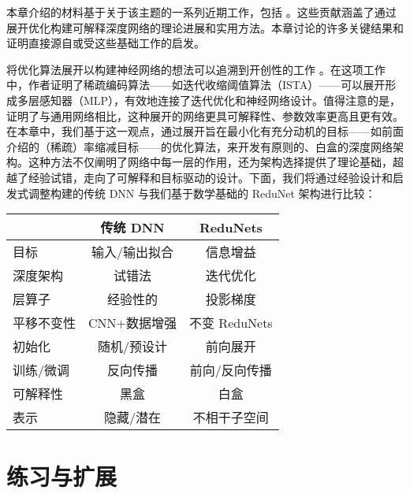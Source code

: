 \documentclass[../../book-main_zh.tex]{subfiles}
\begin{document}
本章介绍的材料基于关于该主题的一系列近期工作，包括 \cite{chan2021redunet, wang2024global, wang2025attention, wu2025token, yu2023white}。这些贡献涵盖了通过展开优化构建可解释深度网络的理论进展和实用方法。本章讨论的许多关键结果和证明直接源自或受这些基础工作的启发。


将优化算法展开以构建神经网络的想法可以追溯到开创性的工作 \cite{gregor2010learning}。在这项工作中，作者证明了稀疏编码算法——如迭代收缩阈值算法（ISTA）——可以展开形成多层感知器（MLP），有效地连接了迭代优化和神经网络设计。值得注意的是，\cite{monga2019algorithm} 证明了与通用网络相比，这种展开的网络更具可解释性、参数效率更高且更有效。在本章中，我们基于这一观点，通过展开旨在最小化有充分动机的目标——如前面介绍的（稀疏）率缩减目标——的优化算法，来开发有原则的、白盒的深度网络架构。这种方法不仅阐明了网络中每一层的作用，还为架构选择提供了理论基础，超越了经验试错，走向了可解释和目标驱动的设计。下面，我们将通过经验设计和启发式调整构建的传统 DNN 与我们基于数学基础的 ReduNet 架构进行比较：

\begin{center}
\begin{tabular}{| l || c | c |}
\hline
  & 传统 DNN & ReduNets\\ [0.5ex]
  \hline \hline
目标 & 输入/输出拟合 & 信息增益\\ [0.5ex]
  \hline
深度架构 & 试错法 & 迭代优化 \\  [0.5ex]
\hline
层算子 & 经验性的 & 投影梯度 \\  [0.5ex]
\hline
平移不变性 & CNN+数据增强 & 不变 ReduNets \\  [0.5ex]
\hline
初始化 & 随机/预设计 & 前向展开 \\ [0.5ex]
\hline
训练/微调 & 反向传播 & 前向/反向传播\\ [0.5ex]
\hline
可解释性 & 黑盒 & 白盒 \\ [0.5ex]
\hline
表示 & 隐藏/潜在 & 不相干子空间 \\ [0.5ex]
\hline
\end{tabular}
\end{center}




\section{练习与扩展}
\end{document}
